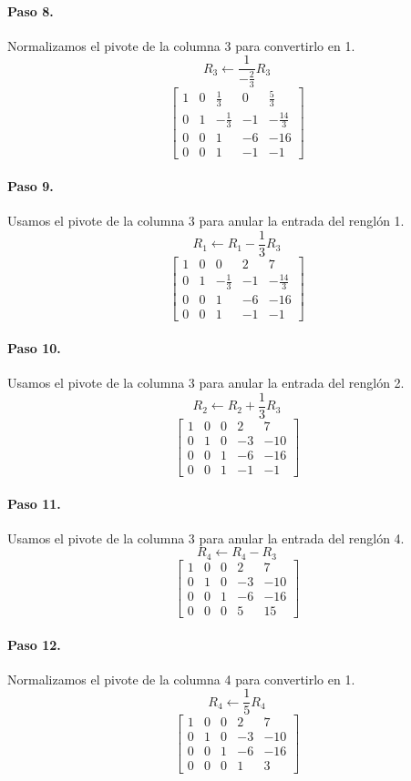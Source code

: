 \documentclass[12pt]{article}
\theoremstyle{remark}
\begin{document}
\paragraph{Paso 8.} Normalizamos el pivote de la columna 3 para convertirlo en 1.
\[
R_{3}\leftarrow \frac{1}{- \frac{2}{3}}R_{3}
\]
\[
\left[\begin{array}{cccc|c}
1 & 0 & \frac{1}{3} & 0 & \frac{5}{3}\\
0 & 1 & - \frac{1}{3} & -1 & - \frac{14}{3}\\
0 & 0 & 1 & -6 & -16\\
0 & 0 & 1 & -1 & -1
\end{array}\right]
\]
\paragraph{Paso 9.} Usamos el pivote de la columna 3 para anular la entrada del renglón 1.
\[
R_{1}\leftarrow R_{1}-\frac{1}{3}R_{3}
\]
\[
\left[\begin{array}{cccc|c}
1 & 0 & 0 & 2 & 7\\
0 & 1 & - \frac{1}{3} & -1 & - \frac{14}{3}\\
0 & 0 & 1 & -6 & -16\\
0 & 0 & 1 & -1 & -1
\end{array}\right]
\]
\paragraph{Paso 10.} Usamos el pivote de la columna 3 para anular la entrada del renglón 2.
\[
R_{2}\leftarrow R_{2}+\frac{1}{3}R_{3}
\]
\[
\left[\begin{array}{cccc|c}
1 & 0 & 0 & 2 & 7\\
0 & 1 & 0 & -3 & -10\\
0 & 0 & 1 & -6 & -16\\
0 & 0 & 1 & -1 & -1
\end{array}\right]
\]
\paragraph{Paso 11.} Usamos el pivote de la columna 3 para anular la entrada del renglón 4.
\[
R_{4}\leftarrow R_{4}-R_{3}
\]
\[
\left[\begin{array}{cccc|c}
1 & 0 & 0 & 2 & 7\\
0 & 1 & 0 & -3 & -10\\
0 & 0 & 1 & -6 & -16\\
0 & 0 & 0 & 5 & 15
\end{array}\right]
\]
\paragraph{Paso 12.} Normalizamos el pivote de la columna 4 para convertirlo en 1.
\[
R_{4}\leftarrow \frac{1}{5}R_{4}
\]
\[
\left[\begin{array}{cccc|c}
1 & 0 & 0 & 2 & 7\\
0 & 1 & 0 & -3 & -10\\
0 & 0 & 1 & -6 & -16\\
0 & 0 & 0 & 1 & 3
\end{array}\right]
\]
\end{document}
